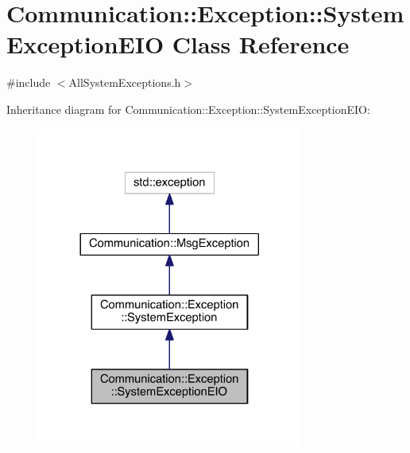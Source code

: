 \hypertarget{class_communication_1_1_exception_1_1_system_exception_e_i_o}{}\section{Communication\+:\+:Exception\+:\+:System\+Exception\+E\+I\+O Class Reference}
\label{class_communication_1_1_exception_1_1_system_exception_e_i_o}


{\ttfamily \#include $<$All\+System\+Exceptions.\+h$>$}



Inheritance diagram for Communication\+:\+:Exception\+:\+:System\+Exception\+E\+I\+O\+:\nopagebreak
\begin{figure}[H]
\begin{center}
\leavevmode
\includegraphics[width=248pt]{class_communication_1_1_exception_1_1_system_exception_e_i_o__inherit__graph}
\end{center}
\end{figure}


